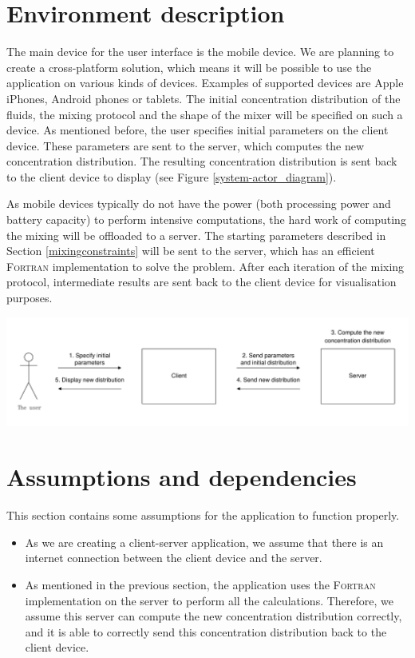 \section{Environment description}
The main device for the user interface is the mobile device. We are planning to create a cross-platform solution, which means it will be possible to use the application on various kinds of devices. Examples of supported devices are Apple iPhones, Android phones or tablets. The initial concentration distribution of the fluids, the mixing protocol and the shape of the mixer will be specified on such a device. As mentioned before, the user specifies initial parameters on the client device. These parameters are sent to the server, which computes the new concentration distribution. The resulting concentration distribution is sent back to the client device to display (see Figure \ref{system-actor_diagram}).

As mobile devices typically do not have the power (both processing power and battery capacity) to perform intensive computations, the hard work of computing the mixing will be offloaded to a server. The starting parameters described in Section \ref{mixingconstraints} will be sent to the server, which has an efficient \textsc{Fortran} implementation to solve the problem. After each iteration of the mixing protocol, intermediate results are sent back to the client device for visualisation purposes.

\includegraphics[width=\textwidth]{system-actor_diagram}


\section{Assumptions and dependencies}
This section contains some assumptions for the application to function properly.

\begin{itemize}
  \item As we are creating a client-server application, we assume that there is an internet connection between the client device and the server.
  \item As mentioned in the previous section, the application uses the \textsc{Fortran} implementation on the server to perform all the calculations. Therefore, we assume this server can compute the new concentration distribution correctly, and it is able to correctly send this concentration distribution back to the client device.
\end{itemize}
